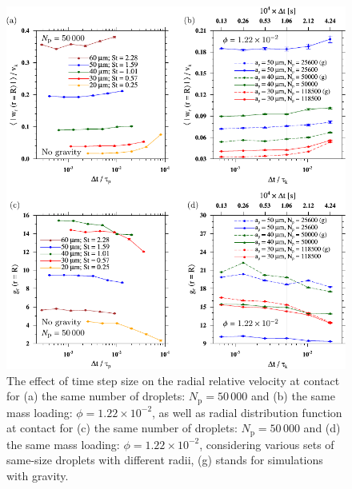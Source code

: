 \documentclass[../thesis.tex]{subfiles}
\begin{document}
\begin{figure}%
\center
\includegraphics[width=\textwidth]{../figs/JFM/fig5.pdf}
\caption{The effect of time step size on the radial relative velocity at contact for (a) the same number of droplets: $N_\mathrm{p} = 50\,000$ and (b) the same mass loading:  $\phi = 1.22\times10^{-2}$, as well as radial distribution function at contact for (c) the same number of droplets: $N_\mathrm{p} = 50\,000$ and (d) the same mass loading: $\phi = 1.22\times10^{-2}$, considering various sets of same-size droplets with different radii, (g) stands for simulations with gravity.}
\label{Fig5}
\end{figure}%
\end{document}
